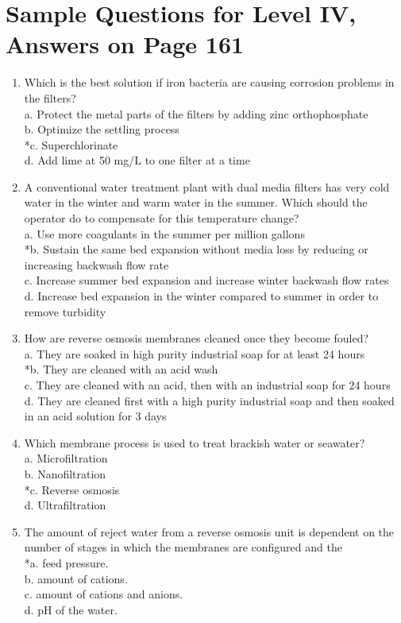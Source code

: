 \section{Sample Questions for Level IV, Answers on Page 161}
\begin{enumerate}[label=TIV-\arabic*]
\item Which is the best solution if iron bacteria are causing corrosion problems in the filters?\\
a. Protect the metal parts of the filters by adding zinc orthophosphate\\
b. Optimize the settling process\\
*c. Superchlorinate\\
d. Add lime at 50 mg/L to one filter at a time\\
\item A conventional water treatment plant with dual media filters has very cold water in the winter and warm water in the summer. Which should the operator do to compensate for this temperature change?\\
a. Use more coagulants in the summer per million gallons\\
*b. Sustain the same bed expansion without media loss by reducing or increasing backwash flow rate\\
c. Increase summer bed expansion and increase winter backwash flow rates\\
d. Increase bed expansion in the winter compared to summer in order to remove turbidity\\
\item How are reverse osmosis membranes cleaned once they become fouled?\\
a. They are soaked in high purity industrial soap for at least 24 hours\\
*b. They are cleaned with an acid wash\\
c. They are cleaned with an acid, then with an industrial soap for 24 hours\\
d. They are cleaned first with a high purity industrial soap and then soaked in an acid solution for 3 days\\
\item Which membrane process is used to treat brackish water or seawater?\\
a. Microfiltration\\
b. Nanofiltration\\
*c. Reverse osmosis\\
d. Ultrafiltration\\
\item The amount of reject water from a reverse osmosis unit is dependent on the number of stages in which the membranes are configured and the\\
*a. feed pressure.\\
b. amount of cations.\\
c. amount of cations and anions.\\
d. pH of the water.\\
\end{enumerate}

